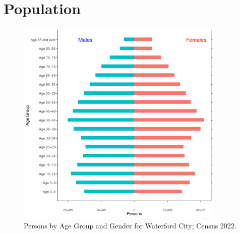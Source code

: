 \documentclass{article}
\begin{document}
\pagebreak

\section{Population} 
\label{sect:Pop}

\begin{figure}[h]
	\centering
	\includegraphics[width = 100mm]{../figures/PyramidPlot.pdf}
	\caption{Persons by Age Group and Gender for Waterford City; Census 2022.}
	\label{fig:2ae19629-1a6a-13a3-e055-000000000001}
	\end{figure}
\end{document}
